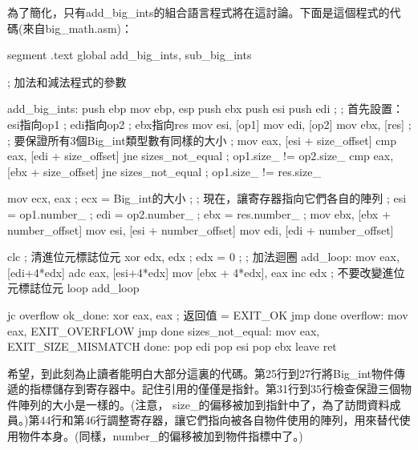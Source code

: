為了簡化，只有{\code add\_big\_ints}的組合語言程式將在這討論。下面是這個程式的代碼(來自{\code big\_math.asm})：
\begin{AsmCodeListing}[label=big\_math.asm]
segment .text
        global  add_big_ints, sub_big_ints


; 加法和減法程式的參數

add_big_ints:
        push    ebp
        mov     ebp, esp
        push    ebx
        push    esi
        push    edi
        ;
        ; 首先設置：esi指向op1
        ;           edi指向op2
        ;           ebx指向res
        mov     esi, [op1]
        mov     edi, [op2]
        mov     ebx, [res]
        ;
        ; 要保證所有3個Big_int類型數有同樣的大小
        ;
        mov     eax, [esi + size_offset]
        cmp     eax, [edi + size_offset]
        jne     sizes_not_equal                 ; op1.size_ != op2.size_
        cmp     eax, [ebx + size_offset]
        jne     sizes_not_equal                 ; op1.size_ != res.size_

        mov     ecx, eax                        ; ecx = Big_int的大小
        ;
        ; 現在，讓寄存器指向它們各自的陣列
        ;      esi = op1.number_
        ;      edi = op2.number_
        ;      ebx = res.number_
        ;
        mov     ebx, [ebx + number_offset]
        mov     esi, [esi + number_offset]
        mov     edi, [edi + number_offset]

        clc                                     ; 清進位元標誌位元
        xor     edx, edx                        ; edx = 0
        ;
        ; 加法迴圈
add_loop:
        mov     eax, [edi+4*edx]
        adc     eax, [esi+4*edx]
        mov     [ebx + 4*edx], eax
        inc     edx                             ; 不要改變進位元標誌位元
        loop    add_loop

        jc      overflow
ok_done:
        xor     eax, eax                        ; 返回值 = EXIT_OK
        jmp     done
overflow:
        mov     eax, EXIT_OVERFLOW
        jmp     done
sizes_not_equal:
        mov     eax, EXIT_SIZE_MISMATCH
done:
        pop     edi
        pop     esi
        pop     ebx
        leave
        ret
\end{AsmCodeListing}

希望，到此刻為止讀者能明白大部分這裏的代碼。第25行到27行將{\code Big\_int}物件傳遞的指標儲存到寄存器中。記住引用的僅僅是指針。第31行到35行檢查保證三個物件陣列的大小是一樣的。(注意，
{\code size\_}的偏移被加到指針中了，為了訪問資料成員。)第44行和第46行調整寄存器，讓它們指向被各自物件使用的陣列，用來替代使用物件本身。(同樣，{\code number\_}的偏移被加到物件指標中了。)

